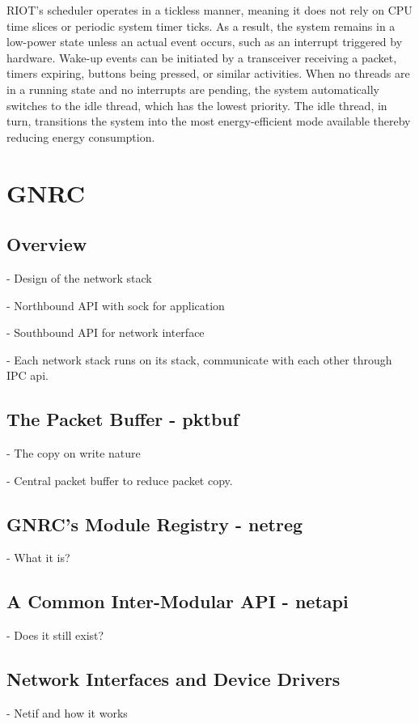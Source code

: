     RIOT's scheduler operates in a tickless manner, meaning it does not rely on CPU time slices 
    or periodic system timer ticks. As a result, the system remains in a low-power state unless 
    an actual event occurs, such as an interrupt triggered by hardware. Wake-up events can be 
    initiated by a transceiver receiving a packet, timers expiring, buttons being pressed, or 
    similar activities. When no threads are in a running state and no interrupts are pending, 
    the system automatically switches to the idle thread, which has the lowest priority. 
    The idle thread, in turn, transitions the system into the most energy-efficient mode available 
    thereby reducing energy consumption.
\section{GNRC}
\subsection{Overview}
  - Design of the network stack
    
    - Northbound API with sock for application

    - Southbound API for network interface

  - Each network stack runs on its stack, communicate with each other through IPC api.
\subsection{The Packet Buffer - pktbuf}
  - The copy on write nature
  
  - Central packet buffer to reduce packet copy.
\subsection{GNRC's Module Registry - netreg}
  - What it is?
\subsection{A Common Inter-Modular API - netapi}
  - Does it still exist?
\subsection{Network Interfaces and Device Drivers}
  - Netif and how it works


